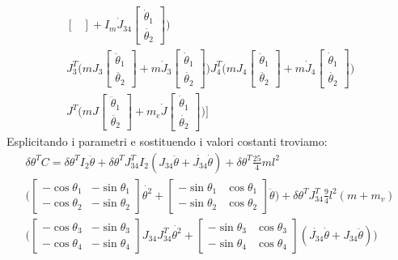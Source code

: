 \begin{equation*}
\begin{split}
\begin{bmatrix}
\end{bmatrix}+I_m\dot{J}_{34} \begin{bmatrix}
\dot{\theta}_1 \\ \dot{\theta_2}
\end{bmatrix} \bigg) \\ J_3^T \bigg( mJ_3\begin{bmatrix}
\ddot{\theta}_1 \\ \ddot{\theta_2}
\end{bmatrix}+m\dot{J}_3 \begin{bmatrix}
\dot{\theta}_1 \\ \dot{\theta_2}
\end{bmatrix} \bigg) J_4^T \bigg( mJ_4\begin{bmatrix}
\ddot{\theta}_1 \\ \ddot{\theta_2}
\end{bmatrix}+m\dot{J}_4 \begin{bmatrix}
\dot{\theta}_1 \\ \dot{\theta_2}
\end{bmatrix} \bigg) \\ J^T \bigg( mJ\begin{bmatrix}
\ddot{\theta}_1 \\ \ddot{\theta_2}
\end{bmatrix}+m_e\dot{J} \begin{bmatrix}
\dot{\theta}_1 \\ \dot{\theta_2}
\end{bmatrix} \bigg)\Bigg]
\end{split} 
\end{equation*}
Esplicitando i parametri e sostituendo i valori costanti troviamo:
\begin{equation*}
\begin{aligned}
    \delta \theta^T C = \delta \theta^T I_2 \ddot{\theta} + \delta \theta^T J_{34}^T I_2(J_{34}\ddot{\theta}+\dot{J_{34}}\dot{\theta})+ \delta \theta^T \frac{25}{4}ml^2\\\bigg(\begin{bmatrix}
    -\cos\theta_1 & -\sin\theta_1 \\ -\cos\theta_2 & -\sin\theta_2
    \end{bmatrix}
    \dot{\theta^2} + \begin{bmatrix}
    -\sin\theta_1 & \cos\theta_1 \\ -\sin\theta_2 & \cos\theta_2
    \end{bmatrix} \ddot{\theta}\bigg) +  \delta \theta^T J_{34}^T\frac{9}{4}l^2(m+m_v)\\\bigg(\begin{bmatrix}
    -\cos\theta_3 & -\sin\theta_3 \\ -\cos\theta_4 & -\sin\theta_4
    \end{bmatrix}J_{34}J_{34}^T\dot{\theta^2}+\begin{bmatrix}
    -\sin\theta_3 & \cos\theta_3 \\ -\sin\theta_4 & \cos\theta_4
    \end{bmatrix}(\dot{J_{34}}\dot{\theta}+J_{34}\ddot{\theta})\bigg)
    \end{aligned}
\end{equation*}

